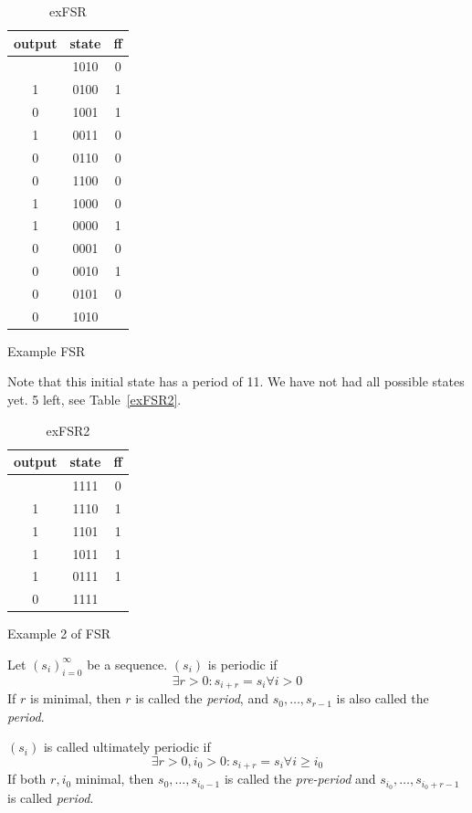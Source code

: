 \documentclass[language=english,number=]{homework}
\begin{document}
\begin{table}
\centering
\begin{tabular}{c|c|c}
output & state & ff \\ \hline
& 1010 &0 \\
1 & 0100 & 1 \\
0 & 1001 & 1 \\
1 & 0011 & 0 \\
0 & 0110 & 0 \\
0 & 1100 & 0 \\
1 & 1000 & 0 \\
1 & 0000 & 1 \\
0 & 0001 & 0 \\
0 & 0010 & 1 \\
0 & 0101 & 0 \\
0 & 1010 & \\
\end{tabular}
\caption{Example FSR}
\caption{exFSR}
\end{table}
Note that this initial state has a period of 11.
We have not had all possible states yet.
5 left, see Table~\ref{exFSR2}.

\begin{table}
\centering
\begin{tabular}{c|c|c}
output & state & ff \\ \hline
& 1111 & 0 \\
1 & 1110 & 1 \\
1 & 1101 & 1 \\
1 & 1011 & 1 \\
1 & 0111 & 1 \\
0 & 1111 &
\end{tabular}
\caption{Example 2 of FSR}
\caption{exFSR2}
\end{table}

\begin{definition}[Periodic]
Let $(s_i)_{i=0}^{\infty}$ be a sequence.
$(s_i)$ is periodic if
\[
\exists r > 0 : s_{i+r} = s_i \forall i > 0
\]
If $r$ is minimal, then $r$ is called the \textit{period}, and $s_0, \dots, s_{r-1}$ is also called the \textit{period}.
\end{definition}

\begin{definition}
$(s_i)$ is called ultimately periodic if
\[
\exists r > 0, i_0 > 0 : s_{i+r} = s_{i} \forall i \ge i_0
\]
If both $r, i_0$ minimal, then $s_0, \dots, s_{i_0 - 1}$ is called the \textit{pre-period} and $s_{i_0}, \dots, s_{i_0 + r-1}$ is called \textit{period}.
\end{definition}
\end{document}
